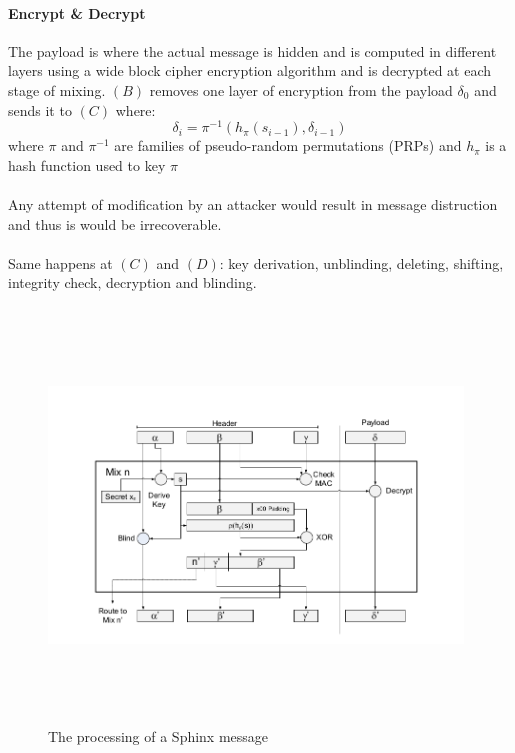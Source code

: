 \paragraph{Encrypt \& Decrypt}
The payload is where the actual message is hidden and is computed in different layers using a wide block cipher encryption algorithm and is decrypted at each stage of mixing. $(B)$ removes one layer of encryption from the payload $\delta_0$ and sends it to $(C)$ where:
$$\delta_i=\pi^{-1}(h_{\pi}(s_{i-1}), \delta_{i-1})$$
where $\pi$ and $\pi^{-1}$ are families of pseudo-random permutations (PRPs) and $h_{\pi}$ is a hash function used to key $\pi$
\\~\\Any attempt of modification by an attacker would result in message distruction and thus is would be irrecoverable.
\\~\\Same happens at $(C)$ and $(D)$: key derivation, unblinding, deleting, shifting, integrity check, decryption and blinding.
\begin{figure}[H]
    \centering
    \includegraphics[width=11cm,height=11cm,keepaspectratio]{../yellowpaper/images/sphinx1.png}
    \caption{The processing of a Sphinx message}
    \label{fig:The processing of a Sphinx message }
\end{figure}
